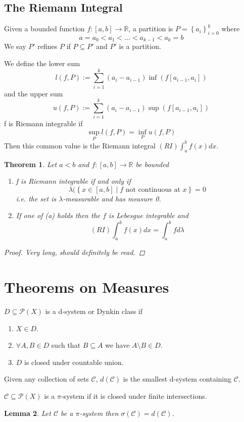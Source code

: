 \documentclass[11pt]{article}
\newcommand{\defeq}{:=}
\newcommand{\relmiddle}[1]{\mathrel{}\middle#1\mathrel{}}
\newcommand{\rmv}{\relmiddle|}
\newcommand{\R}{\mathbb{R}}
\newenvironment{defin}
	{\begin{mdframed}[backgroundcolor=white, roundcorner=5pt, linewidth=1pt]}
	{\end{mdframed}}
\newcommand{\mdf}[1]{{\color{red} #1}}
\newtheorem{theorem}{Theorem}[section]
\newtheorem{lemma}[theorem]{Lemma}
\begin{document}
\subsection{The Riemann Integral}
\begin{defin}
	Given a bounded function $f:[a, b]\to\R$, a \mdf{partition} is $P=\left\{a_i\right\}_{i=0}^k$ where
	\[
		a=a_0 < a_1 < \dots < a_{k-1} < a_k = b
	\]
	We say $P'$ \mdf{refines} $P$ if $P\subseteq P'$ and $P'$ is a partition.

	We define the \mdf{lower sum}
	\[
		l(f,P)\defeq\sum_{i=1}^{k}(a_i-a_{i-1})\inf(f[a_{i-1}, a_i])
	\]
	and the \mdf{upper sum}
	\[
		u(f, P)\defeq\sum_{i=1}^{k}(a_i-a_{i-1})\sup(f[a_{i-1},a_i])
	\]
	f is \mdf{Riemann integrable} if
	\[
		\sup_P l(f, P) = \inf_P u(f, P)
	\]
	Then this common value is the \mdf{Riemann integral $(RI)\int_a^b f(x) dx$}.
\end{defin}
\begin{theorem}
Let $a < b$ and $f:[a, b]\to\R$ be bounded
\begin{enumerate}[label=(\alph*)]
	\item f is Riemann integrable if and only if
		\[
			\lambda(\left\{x\in[a, b] \rmv f\text{ not continuous at } x\right\}=0
		\]
		i.e. the set is $\lambda$-measurable and has measure 0.
	\item If one of \textit{(a)} holds then the $f$ is Lebesgue integrable and
		\[
			(RI)\int_a^b f(x) dx = \int_a^b f d\lambda
		\]
\end{enumerate}
\begin{proof}
Very long, should definitely be read.
\end{proof}
\end{theorem}

\section{Theorems on Measures}
\begin{defin}
	$D\subseteq\mathcal{P}(X)$ is a \mdf{d-system} or \mdf{Dynkin class} if
	\begin{enumerate}[label=(\alph*)]
		\item $X\in D$.
		\item $\forall A, B \in D$ such that $B\subseteq A$ we have $A\setminus B\in D$.
		\item $D$ is closed under countable union.
	\end{enumerate}
	Given any collection of sets $\mathcal{C}$, \mdf{$d(\mathcal{C})$} is the smallest d-system containing $\mathcal{C}$.

	$\mathcal{C}\subseteq\mathcal{P}(X)$ is a \mdf{$\pi$-system} if it is closed under finite intersections.
\end{defin}
\begin{lemma}
Let $\mathcal{C}$ be a $\pi$-system then $\sigma(\mathcal{C})=d(\mathcal{C})$.
\end{lemma}
\end{document}
